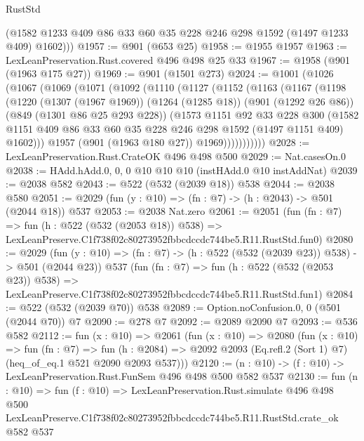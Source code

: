 \begin{lexlean}{RustStd}
\begin{coremodule}
        (@1582 @1233 @409 @86 @33 @60 @35 @228 @246 @298 @1592 (@1497 @1233 @409) @1602)))
@1957 := @901 (@653 @25)
@1958 := @1955 @1957
@1963 := LexLeanPreservation.Rust.covered @496 @498 @25 @33
@1967 := @1958 (@901 (@1963 @175 @27))
@1969 := @901 (@1501 @273)
@2024 := @1001
    (@1026
      (@1067
        (@1069
          (@1071
            (@1092
              (@1110
                (@1127
                  (@1152
                    (@1163
                      (@1167
                        (@1198
                          (@1220
                            (@1307 (@1967 @1969))
                            (@1264 (@1285 @18))
                            (@901 (@1292 @26 @86))
                            (@849 (@1301 @86 @25 @293 @228))
                            (@1573
                              @1151
                              @92
                              @33
                              @228
                              @300
                              (@1582
                                @1151
                                @409
                                @86
                                @33
                                @60
                                @35
                                @228
                                @246
                                @298
                                @1592
                                (@1497 @1151 @409)
                                @1602)))
                          @1957
                          (@901 (@1963 @180 @27))
                          @1969)))))))))))
@2028 := LexLeanPreservation.Rust.CrateOK @496 @498 @500
@2029 := Nat.casesOn.{0}
@2038 := HAdd.hAdd.{0, 0, 0} @10 @10 @10 (instHAdd.{0} @10 instAddNat)
@2039 := @2038 @582
@2043 := @522 (@532 (@2039 @18)) @538
@2044 := @2038 @580
@2051 := @2029 (fun (y : @10) => (fn : @7) -> (h : @2043) -> @501 (@2044 @18)) @537
@2053 := @2038 Nat.zero
@2061 := @2051
    (fun (fn : @7) =>
    fun (h : @522 (@532 (@2053 @18)) @538) =>
    LexLeanPreserve.C1f738f02c80273952fbbcdccdc744be5.R11.RustStd.fun0)
@2080 := @2029
    (fun (y : @10) => (fn : @7) -> (h : @522 (@532 (@2039 @23)) @538) -> @501 (@2044 @23))
    @537
    (fun (fn : @7) =>
    fun (h : @522 (@532 (@2053 @23)) @538) =>
    LexLeanPreserve.C1f738f02c80273952fbbcdccdc744be5.R11.RustStd.fun1)
@2084 := @522 (@532 (@2039 @70)) @538
@2089 := Option.noConfusion.{0, 0} (@501 (@2044 @70)) @7
@2090 := @278 @7
@2092 := @2089 @2090 @7
@2093 := @536 @582
@2112 := fun (x : @10) =>
  @2061
    (fun (x : @10) =>
    @2080
      (fun (x : @10) =>
      fun (fn : @7) =>
      fun (h : @2084) =>
      @2092 @2093 (Eq.refl.{2} (Sort 1) @7) (heq_of_eq.{1} @521 @2090 @2093 @537)))
@2120 := (n : @10) -> (f : @10) -> LexLeanPreservation.Rust.FunSem @496 @498 @500 @582 @537
@2130 := fun (n : @10) =>
  fun (f : @10) =>
  LexLeanPreservation.Rust.simulate
    @496
    @498
    @500
    LexLeanPreserve.C1f738f02c80273952fbbcdccdc744be5.R11.RustStd.crate_ok
    @582
    @537
\end{coremodule}
\end{lexlean}

